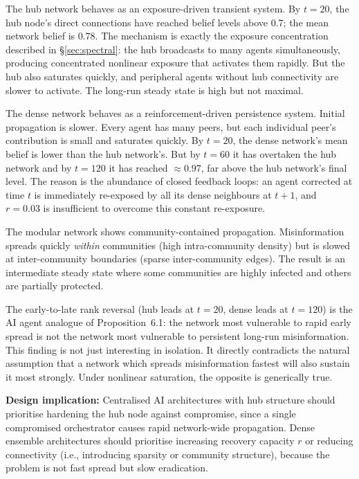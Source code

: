 \documentclass[10pt,twocolumn]{article}
\theoremstyle{myproof}
\begin{document}
The hub network behaves as an exposure-driven transient system. By $t=20$, the hub node's direct
connections have reached belief levels above 0.7; the mean network belief is 0.78. The mechanism
is exactly the exposure concentration described in \S\ref{sec:spectral}: the hub broadcasts to
many agents simultaneously, producing concentrated nonlinear exposure that activates them rapidly.
But the hub also saturates quickly, and peripheral agents without hub connectivity are slower to
activate. The long-run steady state is high but not maximal.

The dense network behaves as a reinforcement-driven persistence system. Initial propagation is
slower. Every agent has many peers, but each individual peer's contribution is small and
saturates quickly. By $t=20$, the dense network's mean belief is lower than the hub network's.
But by $t=60$ it has overtaken the hub network and by $t=120$ it has reached $\approx0.97$, far
above the hub network's final level. The reason is the abundance of closed feedback loops: an
agent corrected at time $t$ is immediately re-exposed by all its dense neighbours at $t+1$, and
$r=0.03$ is insufficient to overcome this constant re-exposure.

The modular network shows community-contained propagation. Misinformation spreads quickly
\emph{within} communities (high intra-community density) but is slowed at inter-community
boundaries (sparse inter-community edges). The result is an intermediate steady state where some
communities are highly infected and others are partially protected.

The early-to-late rank reversal (hub leads at $t=20$, dense leads at $t=120$) is the AI agent
analogue of Proposition~6.1: the network most vulnerable to rapid early spread is not the network
most vulnerable to persistent long-run misinformation. This finding is not just interesting in
isolation. It directly contradicts the natural assumption that a network which spreads
misinformation fastest will also sustain it most strongly. Under nonlinear saturation, the
opposite is generically true.

\textbf{Design implication:} Centralised AI architectures with hub structure should prioritise
hardening the hub node against compromise, since a single compromised orchestrator causes rapid
network-wide propagation. Dense ensemble architectures should prioritise increasing recovery
capacity $r$ or reducing connectivity (i.e., introducing sparsity or community structure), because the
problem is not fast spread but slow eradication.
\end{document}
